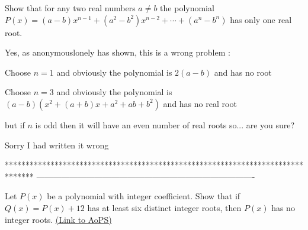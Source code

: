 \begin{solution}
	\begin{tcolorbox}Show that for any two real numbers $a\neq b$ the polynomial $ P(x) = (a-b)x^{n-1} + (a^2 - b^2)x^{n-2} + \cdots + (a^{n}- b^{n})  $ has only one real root.\end{tcolorbox}
Yes, as anonymouslonely has shown, this is a wrong problem :

Choose $n=1$ and obviously the polynomial is $2(a-b)$ and has no root

Choose $n=3$ and obviously the polynomial is $(a-b)(x^2+(a+b)x+a^2+ab+b^2)$ and has no real root
\end{solution}



\begin{solution}
	\begin{tcolorbox}but if $ n $ is odd then it will have an even number of real roots so... are you sure?\end{tcolorbox}

Sorry I had written it wrong
\end{solution}



*******************************************************************************
-------------------------------------------------------------------------------

\begin{problem}
	Let $P(x)$ be a polynomial with integer coefficient. Show that if $Q(x) = P(x) + 12$ has at least six distinct integer roots, then $P(x)$ has no integer roots.
	\flushright \href{https://artofproblemsolving.com/community/c6h485927}{(Link to AoPS)}
\end{problem}



